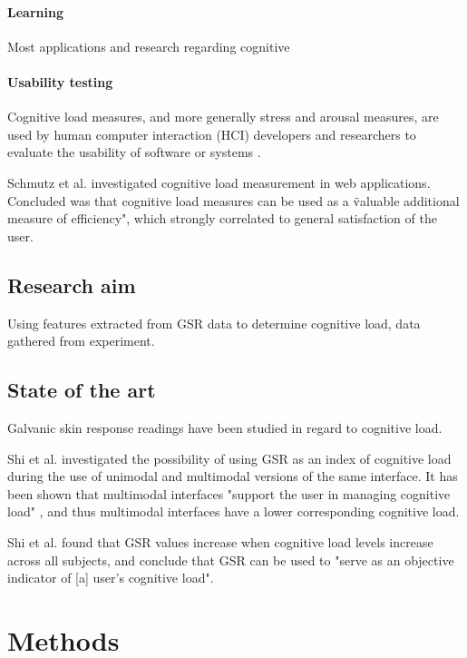 \documentclass[12pt,fleqn,leqno,letterpaper]{article}
\begin{document}
\paragraph{Learning}
Most applications and research regarding cognitive 


\paragraph{Usability testing}
Cognitive load measures, and more generally stress and arousal measures, are used by human computer interaction (HCI) developers and researchers to evaluate the usability of software or systems \citep{Jacob2003} \citep{Schmutz2009}.

Schmutz et al. \citep{Schmutz2009} investigated cognitive load measurement in web applications. Concluded was that cognitive load measures can be used as a \"valuable additional measure of efficiency", which strongly correlated to general satisfaction of the user. 



\subsection{Research aim}
Using features extracted from GSR data to determine cognitive load, data gathered from experiment.

\subsection{State of the art}
Galvanic skin response readings have been studied in regard to cognitive load.

Shi et al. \citep{Shi2007} investigated the possibility of using GSR as an index of cognitive load during the use of unimodal and multimodal versions of the same interface. It has been shown that multimodal interfaces "support the user in managing cognitive load" \citep{Oviatt2004}, and thus multimodal interfaces have a lower corresponding cognitive load. 

Shi et al. found that GSR values increase when cognitive load levels increase across all subjects, and conclude that GSR can be used to "serve as an objective indicator of [a] user's cognitive load".





\section{Methods}
\end{document}
